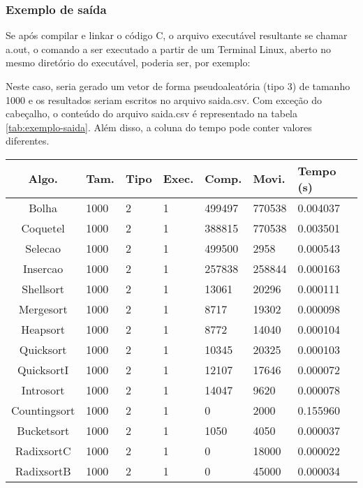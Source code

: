 \subsubsection{Exemplo de saída}
Se após compilar e linkar o código C, o arquivo executável resultante se chamar a.out, o comando a ser executado a partir de um Terminal Linux, aberto no mesmo diretório do executável, poderia ser, por exemplo:

Neste caso, seria gerado um vetor de forma pseudoaleatória (tipo 3) de tamanho 1000 e os resultados seriam escritos no arquivo saida.csv. Com exceção do cabeçalho, o conteúdo do arquivo saida.csv é representado na tabela \ref{tab:exemplo-saida}. Além disso, a coluna do tempo pode conter valores diferentes.
\begin{table}[H]
    \centering
    \begin{tabular}{ | c | l | l | l | l | l | l | }
        \hline
        Algo.        & Tam. & Tipo & Exec. & Comp.  & Movi.  & Tempo (s) \\
        \hline
        Bolha        & 1000 & 2    & 1     & 499497 & 770538 & 0.004037  \\
        Coquetel     & 1000 & 2    & 1     & 388815 & 770538 & 0.003501  \\
        Selecao      & 1000 & 2    & 1     & 499500 & 2958   & 0.000543  \\
        Insercao     & 1000 & 2    & 1     & 257838 & 258844 & 0.000163  \\
        Shellsort    & 1000 & 2    & 1     & 13061  & 20296  & 0.000111  \\
        Mergesort    & 1000 & 2    & 1     & 8717   & 19302  & 0.000098  \\
        Heapsort     & 1000 & 2    & 1     & 8772   & 14040  & 0.000104  \\
        Quicksort    & 1000 & 2    & 1     & 10345  & 20325  & 0.000103  \\
        QuicksortI   & 1000 & 2    & 1     & 12107  & 17646  & 0.000072  \\
        Introsort    & 1000 & 2    & 1     & 14047  & 9620   & 0.000078  \\
        Countingsort & 1000 & 2    & 1     & 0      & 2000   & 0.155960  \\
        Bucketsort   & 1000 & 2    & 1     & 1050   & 4050   & 0.000037  \\
        RadixsortC   & 1000 & 2    & 1     & 0      & 18000  & 0.000022  \\
        RadixsortB   & 1000 & 2    & 1     & 0      & 45000  & 0.000034  \\
        \hline
    \end{tabular}
\end{table}

